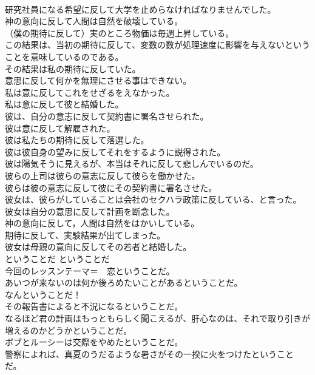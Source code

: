 \documentclass[8pt]{extreport}
\begin{document}
\begin{CJK}{UTF8}{min}
\\	研究社員になる希望に反して大学を止めらなければなりませんでした。   
\\	神の意向に反して人間は自然を破壊している。  
\\	（僕の期待に反して）実のところ物価は毎週上昇している。   
\\	この結果は、当初の期待に反して、変数の数が処理速度に影響を与えないということを意味しているのである。   
\\	その結果は私の期待に反していた。   
\\	意思に反して何かを無理にさせる事はできない。   
\\	私は意に反してこれをせざるをえなかった。   
\\	私は意に反して彼と結婚した。   
\\	彼は、自分の意志に反して契約書に署名させられた。   
\\	彼は意に反して解雇された。   
\\	彼は私たちの期待に反して落選した。   
\\	彼は彼自身の望みに反してそれをするように説得された。   
\\	彼は陽気そうに見えるが、本当はそれに反して悲しんでいるのだ。   
\\	彼らの上司は彼らの意志に反して彼らを働かせた。   
\\	彼らは彼の意志に反して彼にその契約書に署名させた。   
\\	彼女は、彼らがしていることは会社のセクハラ政策に反している、と言った。   
\\	彼女は自分の意思に反して計画を断念した。   
\\	神の意向に反して，人間は自然をはかいしている。  
\\	期待に反して、実験結果が出てしまった。  
\\	彼女は母親の意向に反してその若者と結婚した。   
\\	ということだ	ということだ	
\\	今回のレッスンテーマ＝　恋ということだ。  
\\	あいつが来ないのは何か後ろめたいことがあるということだ。  
\\	なんということだ！  
\\	その報告書によると不況になるということだ。   
\\	なるほど君の計画はもっともらしく聞こえるが、肝心なのは、それで取り引きが増えるのかどうかということだ。   
\\	ボブとルーシーは交際をやめたということだ。   
\\	警察によれば、真夏のうだるような暑さがその一揆に火をつけたということだ。  

\end{CJK}
\end{document}
